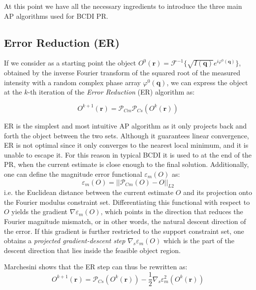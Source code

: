 At this point we have all the necessary ingredients to introduce the three main AP algorithms used for BCDI PR. 

\subsection{Error Reduction (ER)}

If we consider as a starting point the object $O^0(\mathbf{r}) = \mathcal{F}^{-1}\{ \sqrt{I(\mathbf{q})}e^{i\varphi^0(\mathbf{q})}\}$, obtained by 
the inverse Fourier transform of the squared root of the measured intensity with a random complex phase array $\varphi^0(\mathbf{q})$, 
we can express the object at the $k$-th iteration of the \textit{Error Reduction} (ER) algorithm as: 

\begin{equation}
    O^{k+1}(\mathbf{r}) = \mathcal{P}_{Cm}\mathcal{P}_{Cs}(O^{k}(\mathbf{r}))
    \label{eq:ER}
\end{equation}

ER is the simplest and most intuitive AP algorithm as it only projects back and forth the object between the two sets. 
Although it guarantees linear convergence, ER is not optimal since it only converges to the nearest local minimum, and it is unable 
to escape it. For this reason in typical BCDI it is used to at the end of the PR, when the current estimate is close enough 
to the final solution.
Additionally, one can define the magnitude error functional $\varepsilon_m(O)$ as: 
\begin{equation}
    \varepsilon_m(O) = || \mathcal{P}_{Cm}(O)  - O ||_{L2} 
    \label{eq:error_magnitude}
\end{equation}
i.e. the Euclidean distance between the current estimate $O$ and its projection onto the Fourier modulus constraint set. 
Differentiating this functional with respect to $O$ yields the gradient $\nabla \varepsilon_m(O)$, which points in the 
direction that reduces the Fourier magnitude mismatch, or in other words, the natural descent direction of the error.
If this gradient is further restricted to the support constraint set, one obtains a 
\textit{projected gradient-descent step} $\nabla_s \varepsilon_m(O)$ which is the part of the descent direction that 
lies inside the feasible object region.

Marchesini shows that the ER step can thus be rewritten as:
\begin{equation}
    O^{k+1}(\mathbf{r}) = \mathcal{P}_{Cs}(O^{k}(\mathbf{r})) - \frac{1}{2}\nabla_s \varepsilon^{2}_m(O^{k}(\mathbf{r}))
    \label{eq:ER_gradient}
\end{equation}

